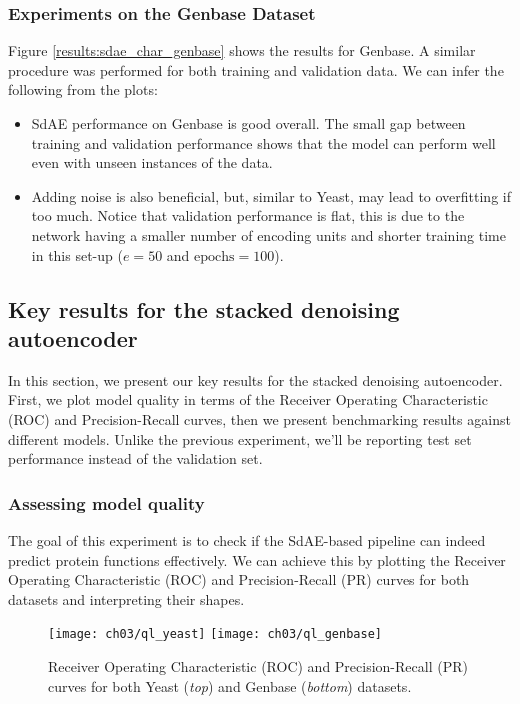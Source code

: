 \subsubsection{Experiments on the Genbase Dataset}
\label{SDExperimentsHyperparamGenbase}

Figure \ref{results:sdae_char_genbase} shows the results for Genbase. A similar
procedure was performed for both training and validation data. We can infer
the following from the plots:

\begin{itemize}
  \item SdAE performance on Genbase is good overall. The small gap between
      training and validation performance shows that the model can perform well
      even with unseen instances of the data.
  \item Adding noise is also beneficial, but, similar to Yeast, may lead to
      overfitting if too much. Notice that validation performance is flat, this
      is due to the network having a smaller number of encoding units and
      shorter training time in this set-up ($e=50$ and $\text{epochs}=100$).
\end{itemize}

\subsection{Key results for the stacked denoising autoencoder}

In this section, we present our key results for the stacked denoising
autoencoder. First, we plot model quality in terms of the Receiver Operating
Characteristic (ROC) and Precision-Recall curves, then we present
benchmarking results against different models. Unlike the previous
experiment, we'll be reporting test set performance instead of the validation
set.

\subsubsection{Assessing model quality}

\par The goal of this experiment is to check if the SdAE-based pipeline can
indeed predict protein functions effectively. We can achieve this by plotting
the Receiver Operating Characteristic (ROC) and Precision-Recall (PR) curves
for both datasets and interpreting their shapes. 

\begin{figure}[!h]
  \centering
  \texttt{[image: ch03/ql\_yeast]}
  \texttt{[image: ch03/ql\_genbase]}
  \caption[Receiver Operating Characteristic (ROC) and Precision-Recall (PR)
  curves for the two protein benchmarks]{
    Receiver Operating Characteristic (ROC) and Precision-Recall (PR) curves
    for both Yeast (\textit{top}) and Genbase (\textit{bottom}) datasets.
  }
  \label{results:sdae_quality}
\end{figure}


